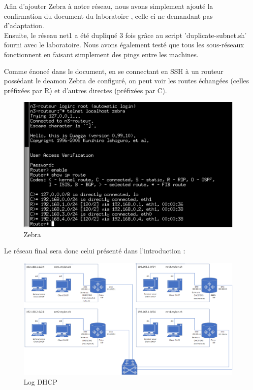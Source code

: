 \documentclass{article}
\begin{document}
Afin d'ajouter Zebra à notre réseau, nous avons simplement ajouté la confirmation du document du laboratoire \cite{doc-labo}, celle-ci ne demandant pas d'adaptation.\\

Ensuite, le réseau net1 a été dupliqué 3 fois grâce au script 'duplicate-subnet.sh' fourni avec le laboratoire. Nous avons également testé que tous les sous-réseaux fonctionnent en faisant simplement des pings entre les machines.

Comme énoncé dans le document, en se connectant en SSH à un routeur possédant le deamon Zebra de configuré, on peut voir les routes échangées (celles préfixées par R) et d'autres directes (préfixées par C).

\begin{figure}[!h]
	\centering
	\includegraphics{./captures/zebra-check.png}
	\caption{Zebra}
	\label{fig:Zebra}
\end{figure}

Le réseau final sera donc celui présenté dans l'introduction : 

\begin{figure}[!h]
	\centering
	\includegraphics[width=\textwidth]{./schemas/Schema-complet.png}
	\caption{Log DHCP}
	\label{fig:Log DHCP}
\end{figure}
\end{document}
